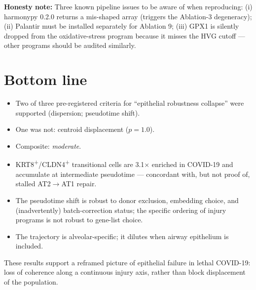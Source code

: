 \documentclass[11pt]{article}
\newcommand{\honest}[1]{\textcolor{red!70!black}{\textbf{Honesty note:} #1}}
\begin{document}
\honest{Three known pipeline issues to be aware of when reproducing: (i) harmonypy 0.2.0 returns a mis-shaped array (triggers the Ablation-3 degeneracy); (ii) Palantir must be installed separately for Ablation 9; (iii) GPX1 is silently dropped from the oxidative-stress program because it misses the HVG cutoff --- other programs should be audited similarly.}

\section{Bottom line}

\begin{itemize}[nosep]
\item Two of three pre-registered criteria for ``epithelial robustness collapse'' were supported (dispersion; pseudotime shift).
\item One was not: centroid displacement ($p = 1.0$).
\item Composite: \emph{moderate}.
\item KRT8\textsuperscript{+}/CLDN4\textsuperscript{+} transitional cells are 3.1$\times$ enriched in COVID-19 and accumulate at intermediate pseudotime --- concordant with, but not proof of, stalled AT2$\rightarrow$AT1 repair.
\item The pseudotime shift is robust to donor exclusion, embedding choice, and (inadvertently) batch-correction status; the specific ordering of injury programs is not robust to gene-list choice.
\item The trajectory is alveolar-specific; it dilutes when airway epithelium is included.
\end{itemize}

These results support a reframed picture of epithelial failure in lethal COVID-19: loss of coherence along a continuous injury axis, rather than block displacement of the population.
\end{document}
